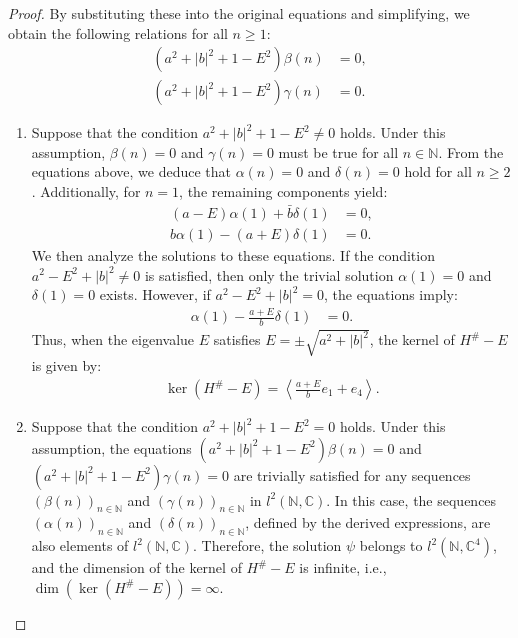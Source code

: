 \documentclass{amsart}
\theoremstyle{definition}
\theoremstyle{remark}
\begin{document}
\begin{proof}
By substituting these into the original equations and simplifying, we obtain the following relations for all \(n \geq 1\):
\begin{align*}
(a^2 + |b|^2 + 1 - E^2)\beta(n) &= 0, \\
(a^2 + |b|^2 + 1 - E^2)\gamma(n) &= 0.
\end{align*}
\begin{enumerate}
    \item Suppose that the condition \(a^2 + |b|^2 + 1 - E^2 \neq 0\) holds. Under this assumption, \(\beta(n) = 0\) and \(\gamma(n) = 0\) must be true for all \(n \in \mathbb{N}\). From the equations above, we deduce that \(\alpha(n) = 0\) and \(\delta(n) = 0\) hold for all \(n \geq 2\). Additionally, for \(n = 1\), the remaining components yield:
    \begin{align*}
    (a - E)\alpha(1) + \bar{b}\delta(1) &= 0, \\
    b\alpha(1) - (a + E)\delta(1) &= 0.
    \end{align*}  
    We then analyze the solutions to these equations. If the condition \(a^2 - E^2 + |b|^2 \neq 0\) is satisfied, then only the trivial solution \(\alpha(1) = 0\) and \(\delta(1) = 0\) exists. However, if \(a^2 - E^2 + |b|^2 = 0\), the equations imply:
    \begin{align*}
    \alpha(1) - \frac{a + E}{b}\delta(1) &= 0.
    \end{align*}  
    Thus, when the eigenvalue \(E\) satisfies \(E = \pm \sqrt{a^2 + |b|^2}\), the kernel of \(H^\# - E\) is given by:
\begin{align*}
\ker(H^\# - E) = \left\langle \frac{a + E}{b} e_1 + e_4 \right\rangle.
\end{align*}
\item Suppose that the condition \(a^2 + |b|^2 + 1 - E^2 = 0\) holds. Under this assumption, the equations \((a^2 + |b|^2 + 1 - E^2)\beta(n) = 0\) and \((a^2 + |b|^2 + 1 - E^2)\gamma(n) = 0\) are trivially satisfied for any sequences \((\beta(n))_{n \in \mathbb{N}}\) and \((\gamma(n))_{n \in \mathbb{N}}\) in \(l^2(\mathbb{N}, \mathbb{C})\). In this case, the sequences \((\alpha(n))_{n \in \mathbb{N}}\) and \((\delta(n))_{n \in \mathbb{N}}\), defined by the derived expressions, are also elements of \(l^2(\mathbb{N}, \mathbb{C})\). Therefore, the solution \(\psi\) belongs to \(l^2(\mathbb{N}, \mathbb{C}^4)\), and the dimension of the kernel of \(H^\# - E\) is infinite, i.e., \(\dim(\ker(H^\# - E)) = \infty\).
\end{enumerate}


\end{proof}
\end{document}
